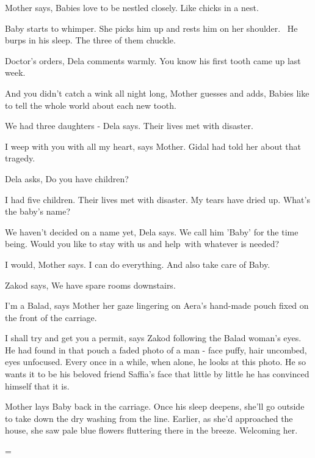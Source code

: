 \documentclass[12pt]{book}
\begin{document}
Mother says, {\textquotedbl}Babies love to be nestled closely. Like chicks in a nest.{\textquotedbl}

Baby starts to whimper. She picks him up and rests him on her shoulder. ~He burps in his sleep. The three of them
chuckle.

{\textquotedbl}Doctor's orders,{\textquotedbl} Dela comments warmly. {\textquotedbl}You know his first tooth came up
last week.{\textquotedbl}~

{\textquotedbl}And you didn't catch a wink all night long,{\textquotedbl} Mother guesses and adds, {\textquotedbl}Babies
like to tell the whole world about each new tooth.{\textquotedbl}

{\textquotedbl}We had three daughters -{\textquotedbl} Dela says. {\textquotedbl}Their lives met with
disaster.{\textquotedbl}

{\textquotedbl}I weep with you with all my heart,{\textquotedbl} says Mother. Gidal had told her about that tragedy.

Dela asks, {\textquotedbl}Do you have children?{\textquotedbl}

{\textquotedbl}I had five children. Their lives met with disaster. My tears have dried up. What's the baby's
name?{\textquotedbl}

{\textquotedbl}We haven't decided on a name yet,{\textquotedbl} Dela says. {\textquotedbl}We call him 'Baby' for the
time being. Would you like to stay with us and help~with whatever is needed?{\textquotedbl}

{\textquotedbl}I would,{\textquotedbl} Mother says. {\textquotedbl}I can do everything. And also take care of
Baby.{\textquotedbl}

Zakod says, {\textquotedbl}We have spare rooms downstairs.{\textquotedbl}

{\textquotedbl}I'm a Balad,{\textquotedbl} says Mother her gaze lingering on Aera's hand-made pouch fixed on the front
of the carriage.

{\textquotedbl}I shall try and get you a permit,{\textquotedbl} says Zakod following the Balad woman's eyes. He had
found in that pouch a faded photo of a man - face puffy, hair uncombed, eyes unfocused. Every once in a while, when
alone, he looks at this photo. He so wants it to be his beloved friend Saffia's face that little by little he has
convinced himself that it is.

Mother lays Baby back in the carriage. Once his sleep deepens, she'll go outside to take down the dry washing from the
line. Earlier, as she'd approached the house, she saw pale blue flowers fluttering there in the breeze. Welcoming her.


\bigskip


\bigskip


\bigskip

{=}


\bigskip
\end{document}
